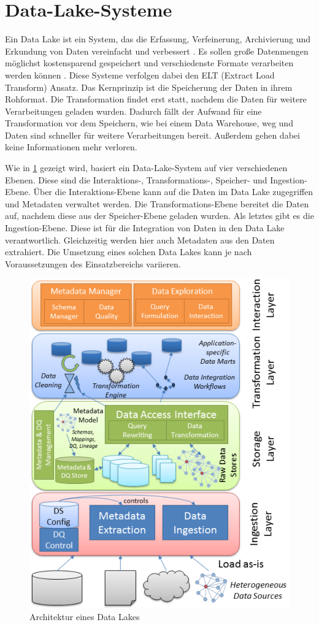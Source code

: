 \section{Data-Lake-Systeme}
\label{sec:einleitung-datalake}

Ein Data Lake ist ein System, das die Erfassung, Verfeinerung, Archivierung und Erkundung von Daten vereinfacht und verbessert \parencite{datalake_01}.
Es sollen große Datenmengen möglichst kostensparend gespeichert und verschiedenste Formate verarbeiten werden können \parencite{datalake_02}.
Diese Systeme verfolgen dabei den ELT (Extract Load Transform) Ansatz.
Das Kernprinzip ist die Speicherung der Daten in ihrem Rohformat.
Die Transformation findet erst statt, nachdem die Daten für weitere Verarbeitungen geladen wurden.
Dadurch fällt der Aufwand für eine Transformation vor dem Speichern, wie bei einem Data Warehouse, weg und Daten sind schneller für weitere Verarbeitungen bereit.
Außerdem gehen dabei keine Informationen mehr verloren.

Wie in \cref{fig:datalake} gezeigt wird, basiert ein Data-Lake-System auf vier verschiedenen Ebenen.
Diese sind die Interaktions-, Transformations-, Speicher- und Ingestion-Ebene.
Über die Interaktions-Ebene kann auf die Daten im Data Lake zugegriffen und Metadaten verwaltet werden.
Die Transformations-Ebene bereitet die Daten auf, nachdem diese aus der Speicher-Ebene geladen wurden.
Als letztes gibt es die Ingestion-Ebene.
Diese ist für die Integration von Daten in den Data Lake verantwortlich.
Gleichzeitig werden hier auch Metadaten aus den Daten extrahiert.
Die Umsetzung eines solchen Data  Lakes kann je nach Voraussetzungen des Einsatzbereichs variieren.

\begin{figure}
    \centering
    \includegraphics[width=.645\textwidth]{Grafiken/data_lake_architecture.PNG}
    \caption{Architektur eines Data Lakes \parencite{datalake_03}}
    \label{fig:datalake}
\end{figure}
\vfill


